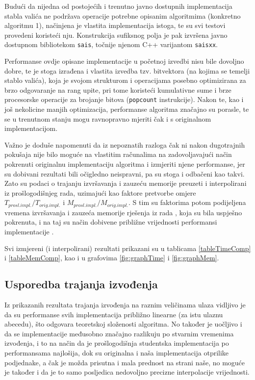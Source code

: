 \documentclass[a4paper,12pt]{article}
\begin{document}
Budući da nijedna od postojećih i trenutno javno dostupnih implementacija stabla valića ne podržava operacije potrebne opisanim algoritmima (konkretno algoritmu 1), načinjena je vlastita implementacija istoga, te su svi testovi provedeni koristeći nju. Konstrukcija sufiksnog polja je pak izvršena javno dostupnom bibliotekom \texttt{sais}, točnije njenom C++ varijantom \texttt{saisxx}.

Performanse ovdje opisane implementacije u početnoj izvedbi nisu bile dovoljno dobre, te je stoga izrađena i vlastita izvedba tzv. bitvektora (na kojima se temelji stablo valića), koja je svojom strukturom i operacijama posebno optimizirana za brzo odgovaranje na rang upite, pri tome koristeći kumulativne sume i brze procesorske operacije za brojanje bitova (\texttt{popcount} instrukcije). Nakon te, kao i još nekolicine manjih optimizacija, performanse algoritma značajno su porasle, te se u trenutnom stanju mogu ravnopravno mjeriti čak i s originalnom implementacijom.

Važno je doduše napomenuti da iz nepoznatih razloga čak ni nakon dugotrajnih pokušaja nije bilo moguće na vlastitim računalima na zadovoljavajući način pokrenuti originalnu implementaciju algoritma i izmjeriti njene performanse, jer su dobivani rezultati bili očigledno neispravni, pa su stoga i odbačeni kao takvi. Zato su podaci o trajanju izvršavanja i zauzeću memorije preuzeti i interpolirani iz prošlogodišnjeg rada, uzimajući kao faktore pretvorbe omjere $T_{prosl.impl.}/T_{orig.impl.}$ i $M_{prosl.impl.}/M_{orig.impl.}$. S tim su faktorima potom podijeljena vremena izvršavanja i zauzeća memorije rješenja iz rada \cite{studenti2017}, koja su bila uspješno pokrenuta, i na taj su način dobivene približne vrijednosti performansi implementacije \cite{beller2013}.

Svi izmjereni (i interpolirani) rezultati prikazani su u tablicama \ref{tableTimeComp} i \ref{tableMemComp}, kao i u grafovima \ref{fig:graphTime} i \ref{fig:graphMem}.

\subsection{Usporedba trajanja izvođenja}

Iz prikazanih rezultata trajanja izvođenja na raznim veličinama ulaza vidljivo je da su performanse svih implementacija približno linearne (za istu ulaznu abecedu), što odgovara teoretskoj složenosti algoritma. No također je uočljivo i da se implementacije međusobno značajno razlikuju po stvarnim vremenima izvođenja, i to na način da je prošlogodišnja studentska implementacija po performansama najlošija, dok su originalna i naša implementacija otprilike podjednake, a čak je možda prisutna i mala prednost na strani naše, no moguće je također i da je to samo posljedica nedovoljno precizne interpolacije vrijednosti.
\end{document}
